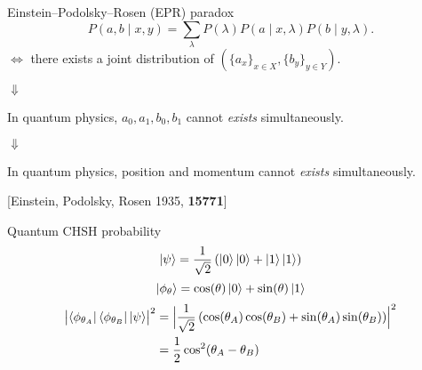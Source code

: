 \documentclass{beamer}
\newcommand\emm[1]{\textcolor{redorange}{{#1}}}
\newcommand\numc[1]{\textcolor{citation}{{\bf #1}}}
\begin{document}
\begin{frame}{Einstein--Podolsky--Rosen (EPR) paradox}
\begin{equation*}
P(a, b\mid x,y) = \sum_{\lambda} P(\lambda) P(a\mid x, \lambda) P(b\mid y,\lambda).
\end{equation*}
$\iff$
there exists a joint distribution of $(\{a_x\}_{x\in X}, \{b_y\}_{y\in Y})$.

\begin{center}
\Large
$\Downarrow$

\vspace{1.0em}
\normalsize
In quantum physics,
$a_0,a_1,b_0,b_1$ \emm{cannot \textit{exists}} simultaneously.

\vspace{1.0em}
\Large
$\Downarrow$

\vspace{1.0em}
\normalsize
In quantum physics,
position and momentum \emm{cannot \textit{exists}} simultaneously.
\end{center}

[Einstein, Podolsky, Rosen 1935, \numc{15771}]
\end{frame}
\fi

\begin{frame}{Quantum CHSH probability}
\begin{equation*}
\ket{\psi} = \frac1{\sqrt{2}}\left(\ket{0}\ket{0} + \ket{1}\ket{1}\right)
\end{equation*}
\begin{equation*}
\ket{\phi_\theta} = \cos(\theta) \ket{0} + \sin(\theta) \ket{1}
\end{equation*}
\begin{align*}
\bigl|\bra{\phi_{\theta_A}}\bra{\phi_{\theta_B}}\ket{\psi}\bigr|^2
&=\Bigl|\frac1{\sqrt{2}}\left(\cos(\theta_A)\cos(\theta_B) + \sin(\theta_A)\sin(\theta_B)\right)\Bigr|^2\\
&=\frac12\cos^2(\theta_A-\theta_B)
\end{align*}
\end{frame}
\end{document}
